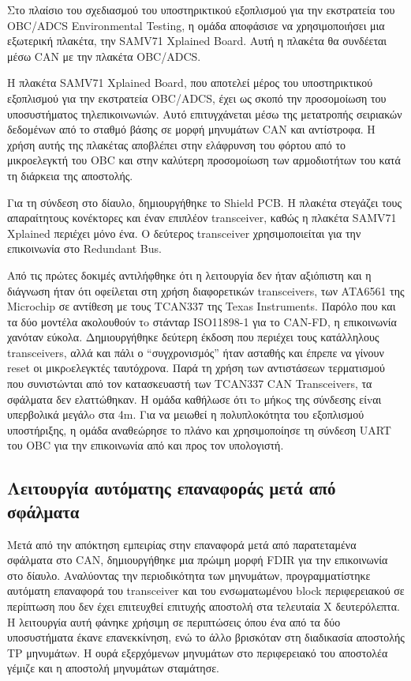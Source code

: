 \documentclass[a4paper,nobib,justified]{tufte-book}
\begin{document}
Στο πλαίσιο του σχεδιασμού του υποστηρικτικού εξοπλισμού για την εκστρατεία του OBC/ADCS Environmental Testing, η ομάδα αποφάσισε να χρησιμοποιήσει μια εξωτερική πλακέτα, την SAMV71 Xplained Board. Αυτή η πλακέτα θα συνδέεται μέσω CAN με την πλακέτα OBC/ADCS. 

Η πλακέτα SAMV71 Xplained Board, που αποτελεί μέρος του υποστηρικτικού εξοπλισμού για την εκστρατεία OBC/ADCS, έχει ως σκοπό την προσομοίωση του υποσυστήματος τηλεπικοινωνιών. Αυτό επιτυγχάνεται μέσω της μετατροπής σειριακών δεδομένων από το σταθμό βάσης σε μορφή μηνυμάτων CAN και αντίστροφα. Η χρήση αυτής της πλακέτας αποβλέπει στην ελάφρυνση του φόρτου από το μικροελεγκτή του OBC και στην καλύτερη προσομοίωση των αρμοδιοτήτων του κατά τη διάρκεια της αποστολής.

Για τη σύνδεση στο δίαυλο, δημιουργήθηκε το Shield PCB. Η πλακέτα στεγάζει τους απαραίτητους κονέκτορες και έναν επιπλέον transceiver, καθώς η πλακέτα SAMV71 Xplained περιέχει μόνο ένα. Ο δεύτερος transceiver χρησιμοποιείται για την επικοινωνία στο Redundant Bus.

Από τις πρώτες δοκιμές αντιλήφθηκε ότι η λειτουργία δεν ήταν αξιόπιστη και η διάγνωση ήταν ότι οφείλεται στη χρήση διαφορετικών transceivers, των ATA6561 της Microchip σε αντίθεση με τους TCAN337 της Texas Instruments. Παρόλο που και τα δύο μοντέλα ακολουθούν τo στάνταρ ISO11898-1 για το CAN-FD, η επικοινωνία χανόταν εύκολα. Δημιουργήθηκε δεύτερη έκδοση που περιέχει τους κατάλληλους transceivers, αλλά και πάλι ο “συγχρονισμός” ήταν ασταθής και έπρεπε να γίνουν reset οι μικρoελεγκτές ταυτόχρονα. Παρά τη χρήση των αντιστάσεων τερματισμού που συνιστώνται από τον κατασκευαστή των TCAN337 CAN Transceivers, τα σφάλματα δεν ελαττώθηκαν. Η ομάδα καθήλωσε ότι τo μήκoς της σύνδεσης είvαι υπερβολικά μεγάλo στα 4m. Για να μειωθεί η πολυπλοκότητα του εξοπλισμού υποστήριξης, η ομάδα αναθεώρησε το πλάνο και χρησιμοποίησε τη σύνδεση UART του OBC για την επικοινωνία από και προς τον υπολογιστή.
\subsection{Λειτουργία αυτόματης επαναφοράς μετά από σφάλματα}
Μετά από την απόκτηση εμπειρίας στην επαναφορά μετά από παρατεταμένα σφάλματα στο CAN, δημιουργήθηκε μια πρώιμη μορφή FDIR για την επικοινωνία στο δίαυλο. Αναλύοντας την περιοδικότητα των μηνυμάτων, προγραμματίστηκε αυτόματη επαναφορά του transceiver και του ενσωματωμένου block περιφερειακού σε περίπτωση που δεν έχει επιτευχθεί επιτυχής αποστολή στα τελευταία X δευτερόλεπτα. Η λειτουργία αυτή φάνηκε χρήσιμη σε περιπτώσεις όπου ένα από τα δύο υποσυστήματα έκανε επανεκκίνηση, ενώ το άλλο βρισκόταν στη διαδικασία αποστολής TP μηνυμάτων. Η ουρά εξερχόμενων μηνυμάτων στο περιφερειακό του αποστολέα γέμιζε και η αποστολή μηνυμάτων σταμάτησε.
\end{document}
